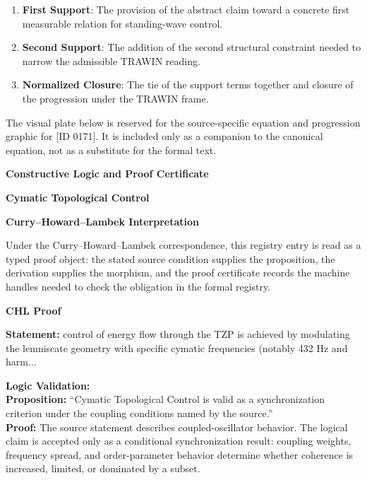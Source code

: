 \begin{enumerate}[leftmargin=1.6em,itemsep=6pt,topsep=4pt]
\item \textbf{First Support}: The provision of the abstract claim toward a concrete first measurable relation for standing-wave control.
\item \textbf{Second Support}: The addition of the second structural constraint needed to narrow the admissible TRAWIN reading.
\item \textbf{Normalized Closure}: The tie of the support terms together and closure of the progression under the TRAWIN frame.
\end{enumerate}

\begingroup\footnotesize\sloppy
The visual plate below is reserved for the source-specific equation and progression graphic for [ID 0171]. It is included only as a companion to the canonical equation, not as a substitute for the formal text.
\par\endgroup
\ifTZPDarkEdition
{}
\fi

\clearpage
\begingroup\tzpsupportsetup
\noindent\textbf{\fontsize{10.8pt}{12.8pt}\selectfont [ID 0171] Constructive Logic and Proof Certificate}\par
\noindent\textbf{\fontsize{10pt}{12pt}\selectfont Cymatic Topological Control}\par
\vspace{0.45em}
\begingroup
\footnotesize
\setlength{\parskip}{0.22em}
\setlength{\parindent}{0pt}
\noindent\textbf{Curry--Howard--Lambek Interpretation}\par
Under the Curry--Howard--Lambek correspondence, this registry entry is read as a typed proof
object: the stated source condition supplies the proposition, the derivation supplies the
morphism, and the proof certificate records the machine handles needed to check the obligation
in the formal registry.

\vspace{0.45em}
\noindent\textbf{CHL Proof}\par
\textbf{Statement:} control of energy flow through the TZP is achieved by modulating the lemniscate geometry
with specific cymatic frequencies (notably 432 Hz and harm...

\textbf{Logic Validation:}\\
\textbf{Proposition:} ``Cymatic Topological Control is valid as a synchronization criterion under the coupling
conditions named by the source.''\\
\textbf{Proof:} The source statement describes coupled-oscillator behavior. The logical claim is
accepted only as a conditional synchronization result: coupling weights, frequency
spread, and order-parameter behavior determine whether coherence is increased, limited,
or dominated by a subset.

